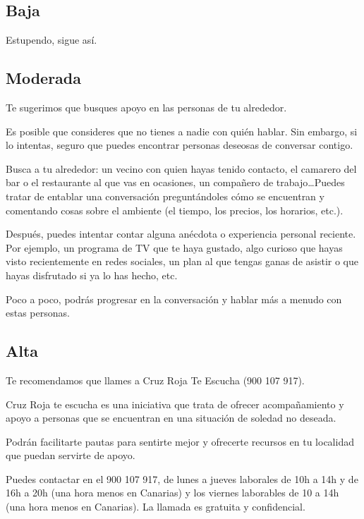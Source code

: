         \subsection{Baja}
            Estupendo, sigue así. 
        \subsection{Moderada}
            Te sugerimos que busques apoyo en las personas de tu alrededor.

            Es posible que consideres que no tienes a nadie con quién hablar. Sin embargo, si lo intentas, seguro que puedes encontrar personas deseosas de conversar contigo.
            
            Busca a tu alrededor: un vecino con quien hayas tenido contacto, el camarero del bar o el restaurante al que vas en ocasiones, un compañero de trabajo…Puedes tratar de entablar una conversación preguntándoles cómo se encuentran y comentando cosas sobre el ambiente (el tiempo, los precios, los horarios, etc.).
            
            Después, puedes intentar contar alguna anécdota o experiencia personal reciente. Por ejemplo, un programa de TV que te haya gustado, algo curioso que hayas visto recientemente en redes sociales, un plan al que tengas ganas de asistir o que hayas disfrutado si ya lo has hecho, etc.
           
            Poco a poco, podrás progresar en la conversación y hablar más a menudo con estas personas.

        \subsection{Alta}
            Te recomendamos que llames a Cruz Roja Te Escucha (900 107 917).

            Cruz Roja te escucha es una iniciativa que trata de ofrecer acompañamiento y apoyo a personas que se encuentran en una situación de soledad no deseada. 
            
            Podrán facilitarte pautas para sentirte mejor y ofrecerte recursos en tu localidad que puedan servirte de apoyo. 
            
            Puedes contactar en el 900 107 917, de lunes a jueves laborales de 10h a 14h y de 16h a 20h (una hora menos en Canarias) y los viernes laborables de 10 a 14h (una hora menos en Canarias). La llamada es gratuita y confidencial.
    
